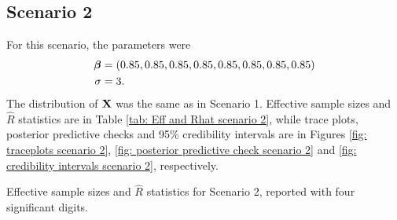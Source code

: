 \documentclass[a4paper, 10pt]{article}
\begin{document}
\subsection*{Scenario 2}

For this scenario, the parameters were
\begin{align*}
    \boldsymbol{\beta} &= (0.85, 0.85, 0.85, 0.85, 0.85, 0.85, 0.85, 0.85) \\
    \sigma &= 3
.\end{align*}
The distribution of $ \mathbf{X} $ was the same as in Scenario 1.
Effective sample sizes and $ \hat{ R } $ statistics are in Table \ref{tab: Eff and Rhat scenario 2}, while trace plots, posterior predictive checks and 95\% credibility intervals are in Figures \ref{fig: traceplots scenario 2}, \ref{fig: posterior predictive check scenario 2} and \ref{fig: credibility intervals scenario 2}, respectively.
\begin{table}[htb]
    \centering
    
    \quad
    
    \caption{Effective sample sizes and $ \hat{ R } $ statistics for Scenario 2, reported with four significant digits.}
    \label{tab: Eff and Rhat scenario 2}
\end{table}
\end{document}
